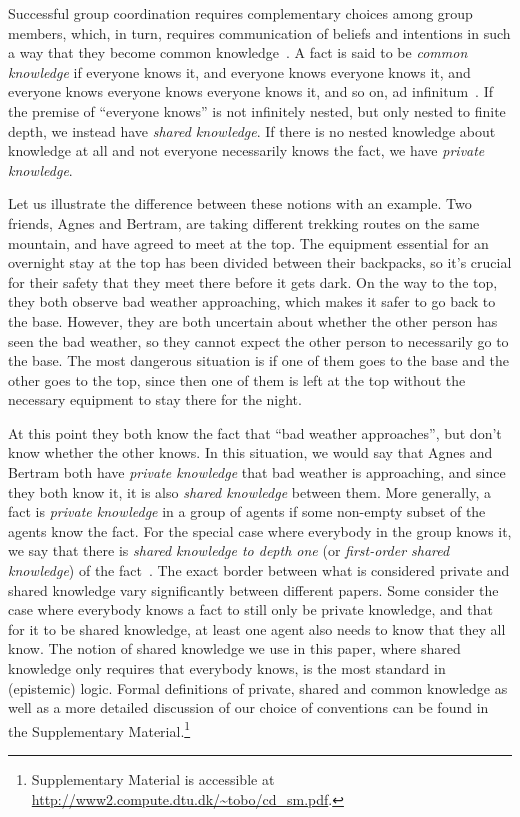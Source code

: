\documentclass[twocolumn,a4paper,superscriptaddress,nofootinbib]{revtex4}
\begin{document}
Successful group coordination requires complementary choices among group members, which, in turn, requires communication of beliefs and intentions in such a way that they become common knowledge~\citep{fagin1995reasoning}. A fact is said to be \textit{common knowledge} if everyone knows it, and everyone knows everyone knows it, and everyone knows everyone knows everyone knows it, and so on, ad infinitum~\citep{lewis1969convention, clark1981definite, schelling1980strategy, aumann1976agreeing}. If the premise of ``everyone knows'' is not infinitely nested, but only nested to finite depth, we instead have \emph{shared knowledge}. If there is no nested knowledge about knowledge at all and not everyone necessarily knows the fact, we have \emph{private knowledge}.

Let us illustrate the difference between these notions with an example. Two friends, Agnes and Bertram, are taking different trekking routes on the same mountain, and have agreed to meet at the top. 
The equipment essential for an overnight stay at the top has been divided between their backpacks, so it's crucial for their safety that they meet there before it gets dark. 
On the way to the top, they both observe bad weather approaching, which makes it safer to go back to the base. However, they are both uncertain about whether the other person has seen the bad weather, so they cannot expect the other person to necessarily go to the base. The most dangerous situation is if one of them goes to the base and the other goes to the top, since then one of them is left at the top without the necessary equipment to stay there for the night. 

At this point they both know the fact that ``bad weather approaches'', but don't know whether the other knows. In this situation, we would say that Agnes and Bertram both have \emph{private knowledge} that bad weather is approaching, and since they both know it, it is also \emph{shared knowledge} between them. More generally, a fact is \emph{private knowledge} in a group of agents if some non-empty subset of the agents know the fact. For the special case where everybody in the group knows it, we say that there is \emph{shared knowledge to depth one} (or \emph{first-order shared knowledge}) of the fact~\citep{clark1981definite}. The exact border between what is considered private and shared knowledge vary significantly between different papers. Some consider the case where everybody knows a fact to still only be private knowledge, and that for it to be shared knowledge, at least one agent also needs to know that they all know. The notion of shared knowledge we use in this paper, where shared knowledge only requires that everybody knows, is the most standard in (epistemic) logic. Formal definitions of private, shared and common knowledge as well as a more detailed discussion of our choice of conventions can be found in the Supplementary Material.\footnote{Supplementary Material is accessible at \url{http://www2.compute.dtu.dk/\~tobo/cd_sm.pdf}.}
\end{document}
